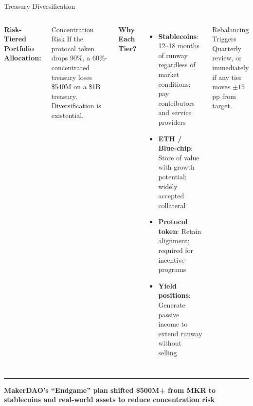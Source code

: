 \documentclass[8pt,aspectratio=169]{beamer}
\newcommand{\bottomnote}[1]{\vfill\vspace{-2mm}\textcolor{mllavender2}{\rule{\textwidth}{0.4pt}}\vspace{1mm}\footnotesize\textbf{#1}}
\begin{document}
\begin{frame}{Treasury Diversification}
\begin{columns}[T]
\vspace{2mm}
\textbf{\textcolor{mlpurple}{Risk-Tiered Portfolio Allocation:}}\\[4pt]
\vspace{4pt}
\begin{alertblock}{Concentration Risk}
\scriptsize If the protocol token drops 90\%, a 60\%-concentrated treasury loses \$540M on a \$1B treasury. Diversification is existential.
\end{alertblock}

\vspace{2mm}
\textbf{\textcolor{mlpurple}{Why Each Tier?}}\\[4pt]
\begin{itemize}\setlength\itemsep{4pt}
  \item \textbf{Stablecoins}: 12--18 months of runway regardless of market conditions; pay contributors and service providers
  \item \textbf{ETH / Blue-chip}: Store of value with growth potential; widely accepted collateral
  \item \textbf{Protocol token}: Retain alignment; required for incentive programs
  \item \textbf{Yield positions}: Generate passive income to extend runway without selling
\end{itemize}
\vspace{4pt}
\begin{block}{Rebalancing Triggers}
\scriptsize Quarterly review, or immediately if any tier moves $\pm 15$pp from target.
\end{block}
\end{columns}
\bottomnote{MakerDAO's ``Endgame'' plan shifted \$500M+ from MKR to stablecoins and real-world assets to reduce concentration risk}
\end{frame}
\end{document}
